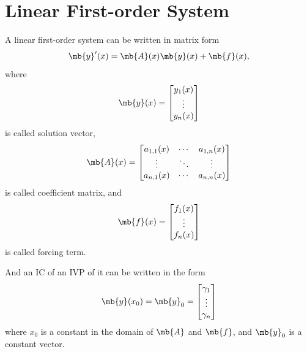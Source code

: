 \documentclass[a4paper,12pt]{report}
\begin{document}
\section{Linear First-order System}
A linear first-order system can be written in matrix form
\[\mb{y}'(x)=\mb{A}(x)\mb{y}(x)+\mb{f}(x),\]
where
\[\mb{y}(x)=\begin{bmatrix}y_1(x)\\\vdots\\y_n(x)\end{bmatrix}\]
is called solution vector,
\[\mb{A}(x)=\begin{bmatrix}a_{1,1}(x) & \cdots & a_{1,n}(x)\\\vdots & \ddots & \vdots\\a_{n,1}(x) & \cdots & a_{n,n}(x)\end{bmatrix}\]
is called coefficient matrix, and
\[\mb{f}(x)=\begin{bmatrix}f_1(x)\\\vdots\\f_n(x)\end{bmatrix}\]
is called forcing term.

And an IC of an IVP of it can be written in the form
\[\mb{y}(x_0)=\mb{y}_0=\begin{bmatrix}\gamma_1\\\vdots\\\gamma_n\end{bmatrix}\]
where $x_0$ is a constant in the domain of $\mb{A}$ and $\mb{f}$, and $\mb{y}_0$ is a constant vector.
\end{document}
